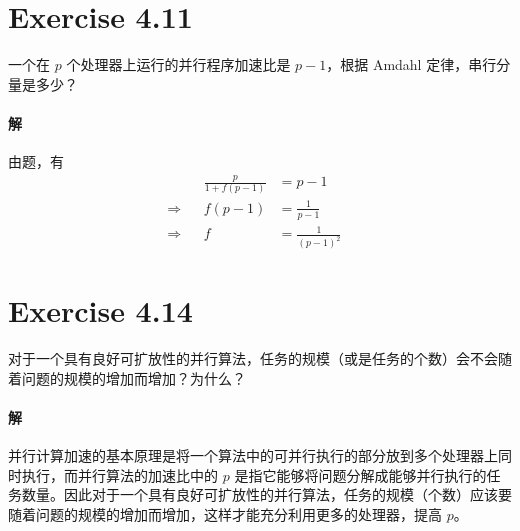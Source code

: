 \documentclass{article}
\begin{document}
\section{Exercise 4.11}
一个在 $p$ 个处理器上运行的并行程序加速比是 $p - 1$，根据 Amdahl 定律，串行分量是多少？

\paragraph{解}
由题，有
\begin{align*}
    && \frac{p}{1 + f(p - 1)} &= p - 1 & \\
    \Rightarrow && f(p - 1) &= \frac{1}{p - 1} & \\
    \Rightarrow && f &= \frac{1}{(p - 1)^2} &
\end{align*}

\section{Exercise 4.14}
对于一个具有良好可扩放性的并行算法，任务的规模（或是任务的个数）会不会随着问题的规模的增加而增加？为什么？

\paragraph{解}
并行计算加速的基本原理是将一个算法中的可并行执行的部分放到多个处理器上同时执行，而并行算法的加速比中的 $p$ 是指它能够将问题分解成能够并行执行的任务数量。因此对于一个具有良好可扩放性的并行算法，任务的规模（个数）应该要随着问题的规模的增加而增加，这样才能充分利用更多的处理器，提高 $p$。
\end{document}
